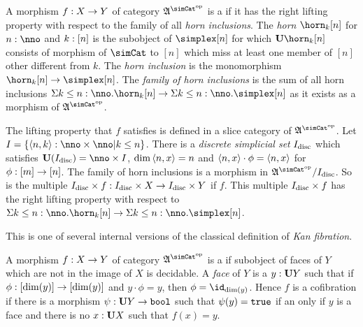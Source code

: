 \documentclass[csh.tex]{subfiles}
\begin{document}
\begin{definition} A morphism $f: X\to Y$ of category $\ambient\s$ is a  if it has the right lifting property with respect to the family of all \emph{horn inclusions}. The \emph{horn} $\horn_k[n]$ for $n\of\nno$ and $k:[n]$ is the subobject of $\simplex[n]$ for which $\base\horn_k[n]$ consists of morphism of $\simCat$ to $[n]$ which miss at least one member of $[n]$ other different from $k$. The \emph{horn inclusion} is the monomorphism $\horn_k[n]\to\simplex[n]$. The \emph{family of horn inclusions} is the sum of all horn inclusions $\Sigma k\leq n\of\nno.\horn_k[n]\to \Sigma k\leq n\of\nno.\simplex[n]$ as it exists as a morphism of $\ambient\s$.

The lifting property that $f$ satisfies is defined in a slice category of $\ambient\s$. Let $I = \set{\tuplet{n,k}\of\nno\times\nno|k\leq n}$. There is a \emph{discrete simplicial set} $I_{\rm disc}$ which satisfies $\base(I\disc) = \nno\times I$, $\dim\left\langle n,x \right\rangle=n$ and $\left\langle n,x \right\rangle\cdot\phi=\left\langle n,x \right\rangle$ for $\phi:[m]\to[n]$. The family of horn inclusions is a morphism in $\ambient\s/I\disc$. So is the multiple $I_{\rm disc}\times f: I_{\rm disc}\times X\to I_{\rm disc}\times Y$ if $f$. This multiple $I_{\rm disc}\times f$ has the right lifting property with respect to $\Sigma k\leq n\of\nno.\horn_k[n]\to \Sigma k\leq n\of\nno.\simplex[n]$.
\end{definition}

This is one of several internal versions of the classical definition of \emph{Kan fibration}.

\begin{definition} A morphism $f: X\to Y$ of category $\ambient\s$ is a  if subobject of faces of $Y$ which are not in the image of $X$ is decidable. A \emph{face} of $Y$ is a $y:\mathbf{U} Y$ such that if $\phi: [\dim(y)]\to [\dim(y)]$ and $y\cdot \phi = y$, then $\phi = \id_{\dim(y)}$. Hence $f$ is a cofibration if there is a morphism $\psi:\mathbf{U} Y\to\mathtt{bool}$ such that $\psi(y)=\mathtt{true}$ if an only if $y$ is a face and there is no $x: \mathbf{U} X$ such that $f(x)=y$. 
\end{definition}

\end{document}
